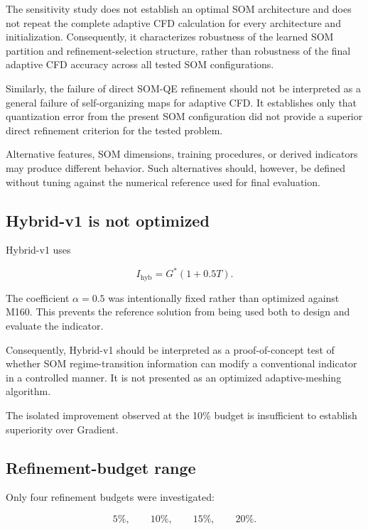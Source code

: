 The sensitivity study does not establish an optimal SOM architecture and
does not repeat the complete adaptive CFD calculation for every architecture
and initialization. Consequently, it characterizes robustness of the learned
SOM partition and refinement-selection structure, rather than robustness of
the final adaptive CFD accuracy across all tested SOM configurations.

Similarly, the failure of direct SOM-QE refinement should not be interpreted
as a general failure of self-organizing maps for adaptive CFD. It establishes
only that quantization error from the present SOM configuration did not
provide a superior direct refinement criterion for the tested problem.

Alternative features, SOM dimensions, training procedures, or derived
indicators may produce different behavior. Such alternatives should,
however, be defined without tuning against the numerical reference used for
final evaluation.

\subsection{Hybrid-v1 is not optimized}

Hybrid-v1 uses

\begin{equation}
I_{\mathrm{hyb}}
=
G^{*}(1+0.5T).
\end{equation}

The coefficient \(\alpha=0.5\) was intentionally fixed rather than optimized
against M160. This prevents the reference solution from being used both to
design and evaluate the indicator.

Consequently, Hybrid-v1 should be interpreted as a proof-of-concept test of
whether SOM regime-transition information can modify a conventional
indicator in a controlled manner. It is not presented as an optimized
adaptive-meshing algorithm.

The isolated improvement observed at the 10\% budget is insufficient to
establish superiority over Gradient.

\subsection{Refinement-budget range}

Only four refinement budgets were investigated:

\begin{equation}
5\%,\qquad10\%,\qquad15\%,\qquad20\%.
\end{equation}

